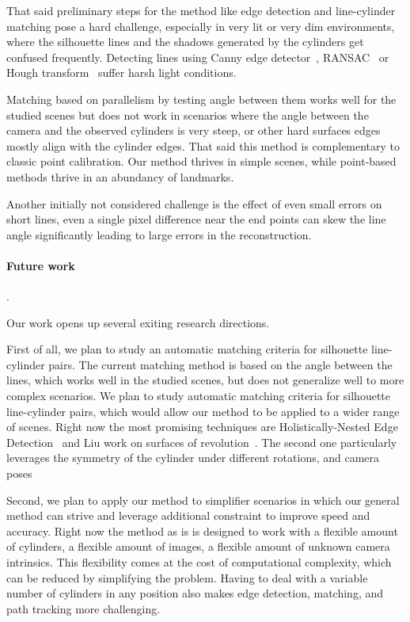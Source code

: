That said preliminary steps for the method like edge detection and line-cylinder matching pose a hard challenge, especially in very lit or very dim environments, where the silhouette lines and the shadows generated by the cylinders get confused frequently.
Detecting lines using Canny edge detector~\cite{Canny1986}, RANSAC~\cite{USAC} or Hough transform~\cite{Yousefi2018} suffer harsh light conditions.

Matching based on parallelism by testing angle between them works well for the studied scenes but does not work in scenarios where the angle between the camera and the observed cylinders is very steep, or other hard surfaces edges mostly align with the cylinder edges. That said this method is complementary to classic point calibration. Our method thrives in simple scenes, while point-based methods thrive in an abundancy of landmarks.

Another initially not considered challenge is the effect of even small errors on short lines, even a single pixel difference near the end points can skew the line angle significantly leading to large errors in the reconstruction.

\paragraph{Future work}.

Our work opens up several exiting research directions.

First of all, we plan to study an automatic matching criteria for silhouette line-cylinder pairs. The current matching method is based on the angle between the lines, which works well in the studied scenes, but does not generalize well to more complex scenarios. We plan to study automatic matching criteria for silhouette line-cylinder pairs, which would allow our method to be applied to a wider range of scenes. Right now the most promising techniques are Holistically-Nested Edge Detection~\cite{Xie2015} and Liu work on surfaces of revolution~\cite{liu2019realtime}. The second one particularly leverages the symmetry of the cylinder under diﬀerent rotations,
and camera poses

Second, we plan to apply our method to simplifier scenarios in which our general method can strive and leverage additional constraint to improve speed and accuracy. Right now the method as is is designed to work with a flexible amount of cylinders, a flexible amount of images, a flexible amount of unknown camera intrinsics. This flexibility comes at the cost of computational complexity, which can be reduced by simplifying the problem. Having to deal with a variable number of cylinders in any position also makes edge detection, matching, and path tracking more challenging.

